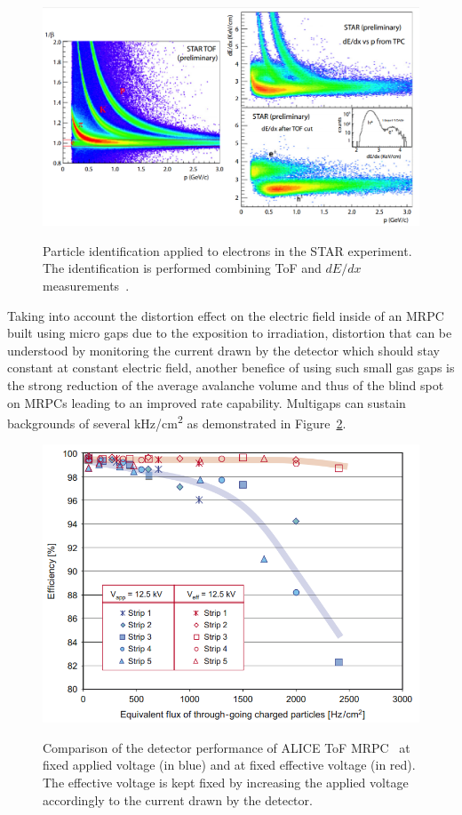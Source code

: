 	\begin{figure}[H]
		\centering
		\includegraphics[width = \plotwidth]{fig/chapt4/STAR-ToF.png}\\
		\caption{\label{fig:ParticleID} Particle identification applied to electrons in the STAR experiment. The identification is performed combining ToF and $dE/dx$ measurements~\cite{WILLIAMS2012}.}
	\end{figure}
	
	Taking into account the distortion effect on the electric field inside of an MRPC built using micro gaps due to the exposition to irradiation, distortion that can be understood by monitoring the current drawn by the detector which should stay constant at constant electric field, another benefice of using such small gas gaps is the strong reduction of the average avalanche volume and thus of the blind spot on MRPCs leading to an improved rate capability. Multigaps can sustain backgrounds of several \si{kHz/cm^2} as demonstrated in Figure~\ref{fig:MRPCRate}.
	
	\begin{figure}[H]
		\centering
		\includegraphics[width = 0.7\plotwidth]{fig/chapt4/ALICE-Rate_Capability.png}\\
		\caption{\label{fig:MRPCRate} Comparison of the detector performance of ALICE ToF MRPC~\cite{ALICI2007} at fixed applied voltage (in blue) and at fixed effective voltage (in red). The effective voltage is kept fixed by increasing the applied voltage accordingly to the current drawn by the detector.}
	\end{figure}
	
